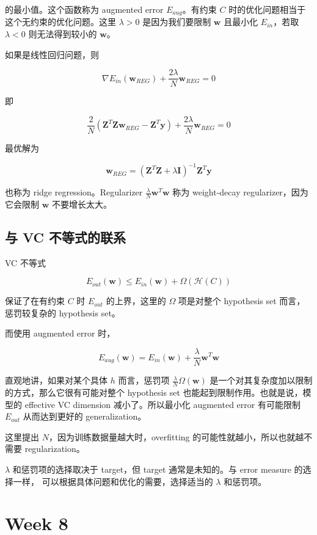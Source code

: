 \documentclass[a4paper]{article}
\begin{document}
的最小值。这个函数称为 augmented error $E_{aug}$。有约束 $C$ 时的优化问题相当于这个无约束的优化问题。这里 $\lambda > 0$ 是因为我们要限制 $\mathbf{w}$ 且最小化 $E_{in}$，若取 $\lambda < 0$ 则无法得到较小的 $\mathbf{w}$。

如果是线性回归问题，则

$$\nabla E_{in}(\mathbf{w}_{REG}) + \frac{2\lambda}{N}\mathbf{w}_{REG} = 0$$

即

$$\frac{2}{N}(\mathbf{Z}^T\mathbf{Z}\mathbf{w}_{REG} - \mathbf{Z}^T\mathbf{y}) + \frac{2\lambda}{N}\mathbf{w}_{REG} = 0$$

最优解为

$$\mathbf{w}_{REG} = (\mathbf{Z}^T\mathbf{Z} + \lambda\mathbf{I})^{-1}\mathbf{Z}^T\mathbf{y}$$

也称为 ridge regression。Regularizer $\frac{\lambda}{N}\mathbf{w}^T\mathbf{w}$ 称为 weight-decay regularizer，因为它会限制 $\mathbf{w}$ 不要增长太大。

\subsection{与 VC 不等式的联系}
VC 不等式

$$E_{out}(\mathbf{w}) \le E_{in}(\mathbf{w}) + \Omega(\mathcal{H}(C))$$

保证了在有约束 $C$ 时 $E_{out}$ 的上界，这里的 $\Omega$ 项是对整个 hypothesis set 而言，
惩罚较复杂的 hypothesis set。

而使用 augmented error 时，

$$E_{aug}(\mathbf{w}) = E_{in}(\mathbf{w}) + \frac{\lambda}{N}\mathbf{w}^T{\mathbf{w}}$$

直观地讲，如果对某个具体 $h$ 而言，惩罚项 $\frac{\lambda}{N}\Omega(\mathbf{w})$ 是一个对其复杂度加以限制的方式，那么它很有可能对整个 hypothesis set 也能起到限制作用。也就是说，模型的 effective VC dimension 减小了。所以最小化 augmented error 有可能限制 $E_{out}$ 从而达到更好的 generalization。

这里提出 $N$，因为训练数据量越大时，overfitting 的可能性就越小，所以也就越不需要 regularization。

$\lambda$ 和惩罚项的选择取决于 target，但 target 通常是未知的。与 error measure 的选择一样，
可以根据具体问题和优化的需要，选择适当的 $\lambda$ 和惩罚项。



\section{Week 8}
\end{document}
